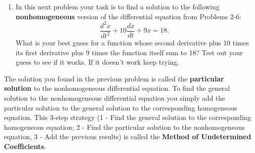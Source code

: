 \newpage
{}
\begin{enumerate}[resume]
\item In this next problem your task is to find a solution to the following \textbf{nonhomogeneous} version of the differential equation from Problems 2-6:
\[
\frac{d^2x}{dt^2}+10\frac{dx}{dt}+9x=18.
\]
What is your best guess for a function whose second derivative plus 10 times its first derivative plus 9 times the function itself sum to 18? Test out your guess to see if it works. If it doesn't work keep trying. \label{13problem8}
\end{enumerate}
\clearpage

The solution you found in the previous problem is called the \textbf{particular solution} to the nonhomogeneous differential equation. To find the general solution to the nonhomogeneous differential equation you simply add the particular solution to the general solution to the corresponding homogeneous equation. This 3-step strategy (1 - Find the general solution to the corresponding homogeneous equation; 2 - Find the particular solution to the nonhomogeneous equation, 3 - Add the previous results) is called the \textbf{Method of Undetermined Coefficients}.

